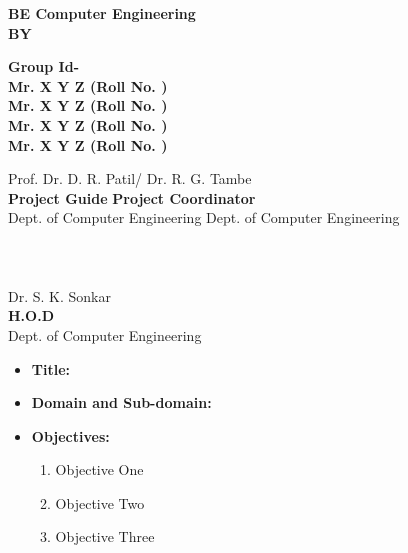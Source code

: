 \documentclass[12pt]{report}	%
\begin{document}
{\begin{center}
\bf {BE Computer Engineering}\\
BY
\end{center}
{\begin{center}
\textbf{Group Id-}\\
\textbf{Mr. X Y Z  (Roll No. )}\\
\textbf{Mr. X Y Z  (Roll No. )}\\
\textbf{Mr. X Y Z  (Roll No. )}\\
\textbf{Mr. X Y Z  (Roll No. )}\\
\end{center}


\vspace*{0.6in}
\hspace*{0.0in}Prof.\hspace{2.9in} Dr. D. R. Patil/ Dr. R. G. Tambe\\
\hspace*{0.3in} \textbf{Project Guide} \hspace{2.3in} \textbf{Project Coordinator}\\
Dept. of Computer Engineering \hspace{1.2in} Dept. of Computer Engineering\\
\\
\\
\\
\hspace*{2.3in}Dr. S. K. Sonkar\\
\hspace*{2.7in} \textbf{H.O.D}\\
\hspace*{1.9in}Dept. of Computer Engineering 
\\


\newpage
{} 

\begin{itemize}

\item{\textbf{Title:}} 

\item{\textbf{Domain and Sub-domain:}} 

\item{\textbf{Objectives:}}
\begin{enumerate}
\item{Objective One}
\item{Objective Two}
\item{Objective Three}
\end{enumerate}


\end{itemize}}}
\end{document}
